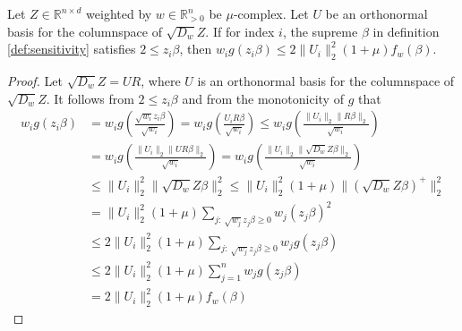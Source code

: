 \begin{lemma}
    Let $Z \in \mathbb{R}^{n \times d}$ weighted by $w \in \mathbb{R}^n_{>0}$
    be $\mu$-complex. Let $U$ be an orthonormal basis for the columnspace
    of $\sqrt{D_w} Z$. If for index $i$, the supreme $\beta$ in definition \ref{def:sensitivity} satisfies
    $2 \leq z_i \beta$, then
    $w_i g(z_i \beta) \leq 2 \lVert U_i \rVert_2^2 (1 + \mu) f_w(\beta)$.
\end{lemma}
\begin{proof}
    Let $\sqrt{D_w} Z = UR$, where $U$ is an orthonormal basis for the columnspace
    of $\sqrt{D_w} Z$. It follows from $2 \leq z_i \beta$ and from the monotonicity
    of $g$ that
    \begin{align*}
        w_i g(z_i \beta)
         & = w_i g\left(\frac{\sqrt{w_i} z_i \beta}{\sqrt{w_i}}\right)
        = w_i g\left(\frac{U_i R \beta}{\sqrt{w_i}}\right)
        \leq w_i g\left(\frac{\lVert U_i \rVert_2 \lVert R \beta \rVert_2}{\sqrt{w_i}}\right)               \\
         & = w_i g\left(\frac{\lVert U_i \rVert_2 \lVert U R \beta \rVert_2}{\sqrt{w_i}}\right)
        = w_i g\left(\frac{\lVert U_i \rVert_2 \lVert \sqrt{D_w} Z \beta \rVert_2}{\sqrt{w_i}}\right)       \\
         & \leq \lVert U_i \rVert_2^2 \lVert \sqrt{D_w} Z \beta \rVert_2^2
        \leq \lVert U_i \rVert_2^2 (1 + \mu) \lVert (\sqrt{D_w} Z \beta)^+ \rVert_2^2                       \\
         & = \lVert U_i \rVert_2^2 (1 + \mu) \sum_{j: \  \sqrt{w_j} z_j \beta \geq 0} w_j (z_j \beta)^2     \\
         & \leq 2 \lVert U_i \rVert_2^2 (1 + \mu) \sum_{j: \  \sqrt{w_j} z_j \beta \geq 0} w_j g(z_j \beta) \\
         & \leq 2 \lVert U_i \rVert_2^2 (1 + \mu) \sum_{j = 1}^n w_j g(z_j \beta)                           \\
         & = 2 \lVert U_i \rVert_2^2 (1 + \mu) f_w(\beta)
    \end{align*}
\end{proof}

